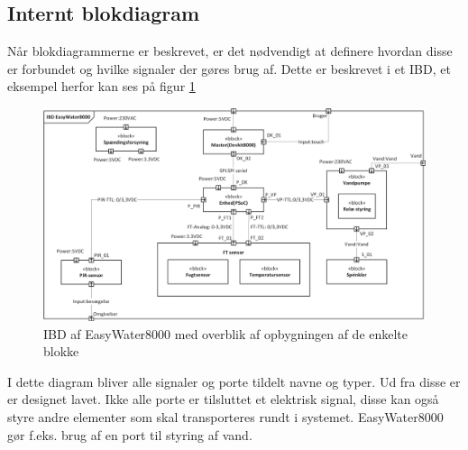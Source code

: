 \subsection{Internt blokdiagram}
Når blokdiagrammerne er beskrevet, er det nødvendigt at definere hvordan disse er forbundet og hvilke signaler der gøres brug af. Dette er beskrevet i et IBD, et eksempel herfor kan ses på figur \ref{lab:IBD}

\begin{figure}[H]
  \centering
    \includegraphics[width=\textwidth]{Billeder/IBD}
    \caption{IBD af EasyWater8000 med overblik af opbygningen af de enkelte blokke}
    \label{lab:IBD}
\end{figure}

I dette diagram bliver alle signaler og porte tildelt navne og typer. Ud fra disse er er designet lavet. Ikke alle porte er tilsluttet et elektrisk signal, disse kan også styre andre elementer som skal transporteres rundt i systemet. EasyWater8000 gør f.eks. brug af en port til styring af vand.